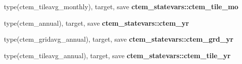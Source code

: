 \begin{DoxyCompactItemize}
\item 
\hypertarget{namespacectem__statevars_af68043090dc6cd2c0615eb7d4b550b18}{}type(ctem\+\_\+tileavg\+\_\+monthly), target, save {\bfseries ctem\+\_\+statevars\+::ctem\+\_\+tile\+\_\+mo}\label{namespacectem__statevars_af68043090dc6cd2c0615eb7d4b550b18}

\item 
\hypertarget{namespacectem__statevars_aa83b75c65f5aa4de37ef1f55a6a54193}{}type(ctem\+\_\+annual), target, save {\bfseries ctem\+\_\+statevars\+::ctem\+\_\+yr}\label{namespacectem__statevars_aa83b75c65f5aa4de37ef1f55a6a54193}

\item 
\hypertarget{namespacectem__statevars_a3fe8917df668048f8e960e0c5c8427e3}{}type(ctem\+\_\+gridavg\+\_\+annual), target, save {\bfseries ctem\+\_\+statevars\+::ctem\+\_\+grd\+\_\+yr}\label{namespacectem__statevars_a3fe8917df668048f8e960e0c5c8427e3}

\item 
\hypertarget{namespacectem__statevars_a74e5918629cea2b5e0e8cd50b271f917}{}type(ctem\+\_\+tileavg\+\_\+annual), target, save {\bfseries ctem\+\_\+statevars\+::ctem\+\_\+tile\+\_\+yr}\label{namespacectem__statevars_a74e5918629cea2b5e0e8cd50b271f917}

\end{DoxyCompactItemize}
